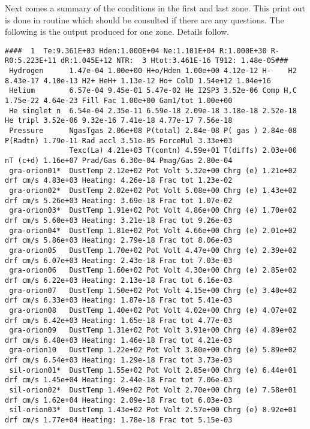 Next comes a summary of the conditions in the first and last zone.
This print out is done in routine  which should
be consulted if there are any questions.
The following is the output produced for one zone.
Details follow.
{\setverbatimfontsize{\tiny}
\begin{verbatim}
####  1  Te:9.361E+03 Hden:1.000E+04 Ne:1.101E+04 R:1.000E+30 R-R0:5.223E+11 dR:1.045E+12 NTR:  3 Htot:3.461E-16 T912: 1.48e-05###
 Hydrogen      1.47e-04 1.00e+00 H+o/Hden 1.00e+00 4.12e-12 H-    H2 8.43e-17 4.10e-13 H2+ HeH+ 1.13e-12 Ho+ ColD 1.54e+12 1.04e+16
 Helium        6.57e-04 9.45e-01 5.47e-02 He I2SP3 3.52e-06 Comp H,C 1.75e-22 4.64e-23 Fill Fac 1.00e+00 Gam1/tot 1.00e+00
 He singlet n  6.54e-04 2.35e-11 6.59e-18 2.09e-18 3.18e-18 2.52e-18 He tripl 3.52e-06 9.32e-16 7.41e-18 4.77e-17 7.56e-18
 Pressure      NgasTgas 2.06e+08 P(total) 2.84e-08 P( gas ) 2.84e-08 P(Radtn) 1.79e-11 Rad accl 3.51e-05 ForceMul 3.33e+03
               Texc(La) 4.21e+03 T(contn) 4.59e+01 T(diffs) 2.03e+00 nT (c+d) 1.16e+07 Prad/Gas 6.30e-04 Pmag/Gas 2.80e-04
 gra-orion01*  DustTemp 2.12e+02 Pot Volt 5.32e+00 Chrg (e) 1.21e+02 drf cm/s 4.83e+03 Heating: 4.26e-18 Frac tot 1.23e-02
 gra-orion02*  DustTemp 2.02e+02 Pot Volt 5.08e+00 Chrg (e) 1.43e+02 drf cm/s 5.26e+03 Heating: 3.69e-18 Frac tot 1.07e-02
 gra-orion03*  DustTemp 1.91e+02 Pot Volt 4.86e+00 Chrg (e) 1.70e+02 drf cm/s 5.60e+03 Heating: 3.21e-18 Frac tot 9.26e-03
 gra-orion04*  DustTemp 1.81e+02 Pot Volt 4.66e+00 Chrg (e) 2.01e+02 drf cm/s 5.86e+03 Heating: 2.79e-18 Frac tot 8.06e-03
 gra-orion05   DustTemp 1.70e+02 Pot Volt 4.47e+00 Chrg (e) 2.39e+02 drf cm/s 6.07e+03 Heating: 2.43e-18 Frac tot 7.03e-03
 gra-orion06   DustTemp 1.60e+02 Pot Volt 4.30e+00 Chrg (e) 2.85e+02 drf cm/s 6.22e+03 Heating: 2.13e-18 Frac tot 6.16e-03
 gra-orion07   DustTemp 1.50e+02 Pot Volt 4.15e+00 Chrg (e) 3.40e+02 drf cm/s 6.33e+03 Heating: 1.87e-18 Frac tot 5.41e-03
 gra-orion08   DustTemp 1.40e+02 Pot Volt 4.02e+00 Chrg (e) 4.07e+02 drf cm/s 6.42e+03 Heating: 1.65e-18 Frac tot 4.77e-03
 gra-orion09   DustTemp 1.31e+02 Pot Volt 3.91e+00 Chrg (e) 4.89e+02 drf cm/s 6.48e+03 Heating: 1.46e-18 Frac tot 4.21e-03
 gra-orion10   DustTemp 1.22e+02 Pot Volt 3.80e+00 Chrg (e) 5.89e+02 drf cm/s 6.54e+03 Heating: 1.29e-18 Frac tot 3.73e-03
 sil-orion01*  DustTemp 1.55e+02 Pot Volt 2.85e+00 Chrg (e) 6.44e+01 drf cm/s 1.45e+04 Heating: 2.44e-18 Frac tot 7.06e-03
 sil-orion02*  DustTemp 1.49e+02 Pot Volt 2.70e+00 Chrg (e) 7.58e+01 drf cm/s 1.62e+04 Heating: 2.09e-18 Frac tot 6.03e-03
 sil-orion03*  DustTemp 1.43e+02 Pot Volt 2.57e+00 Chrg (e) 8.92e+01 drf cm/s 1.77e+04 Heating: 1.78e-18 Frac tot 5.15e-03

\end{verbatim}}
